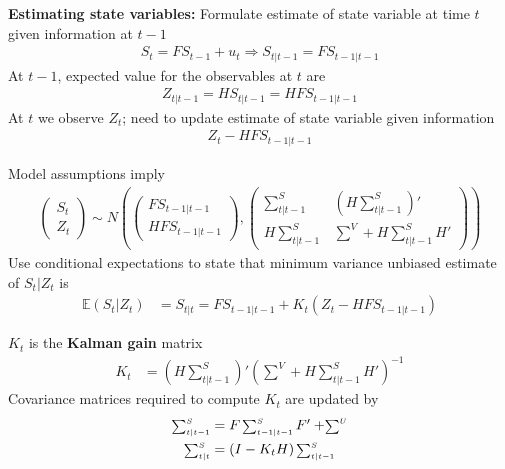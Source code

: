 \documentclass{beamer}
\begin{document}
\begin{frame}
  \textbf{Estimating state variables:} Formulate estimate of state variable at time $t$ given information at $t-1$
  \begin{align}
    S_t=FS_{t-1}+u_t \Rightarrow S_{t|t-1}=FS_{t-1|t-1}
  \end{align}
  At $t-1$, expected value for the observables at $t$ are
  \begin{align}
    Z_{t|t-1}=HS_{t|t-1}=HFS_{t-1|t-1}
  \end{align}
  At $t$ we observe $Z_t$; need to update estimate of state variable given information
  \begin{align}
     Z_t-HFS_{t-1|t-1}
   \end{align} 
\end{frame}

\begin{frame}
  Model assumptions imply
  \begin{align}
    \begin{pmatrix}      S_t \\ Z_t     \end{pmatrix} \sim N \left( 
    \begin{pmatrix}      FS_{t-1|t-1} \\HFS_{t-1|t-1}    \end{pmatrix},
    \begin{pmatrix}      \sum^S_{t|t-1} & \left( H\sum^S_{t|t-1} \right)' \\ H\sum^S_{t|t-1} & \sum^V+H\sum^S_{t|t-1}H' \end{pmatrix} \right)
  \end{align}
  \medskip
  Use conditional expectations to state that minimum variance unbiased estimate of $S_t|Z_t$ is
  \begin{align}
     \mathbb{E}(S_t|Z_t)&=S_{t|t}=FS_{t-1|t-1}+K_t(Z_t-HFS_{t-1|t-1})     
  \end{align}  
\end{frame}

\begin{frame}
  $K_t$ is the \textbf{Kalman gain} matrix
  \begin{align}
    K_t&= \left(H\scriptstyle \sum^S_{t|t-1} \right)' (\scriptstyle \sum^V + H\scriptstyle \sum^S_{t|t-1} \textstyle H')^{-1} 
  \end{align}
  \medskip
  Covariance matrices required to compute $K_t$ are updated by 
  \begin{align}
    \scriptstyle \sum^S_{t|t-1} \textstyle &= F\scriptstyle \sum^S_{t-1|t-1}\textstyle F'+ \scriptstyle\sum^U\\
    \scriptstyle \sum^S_{t|t} \textstyle &= (I-K_tH)\scriptstyle \sum^S_{t|t-1}
  \end{align}
\end{frame}
\end{document}
